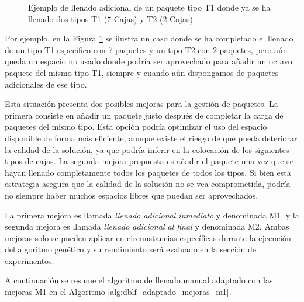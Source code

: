 \begin{figure}[H]
    \centering
    
    \caption{Ejemplo de llenado adicional de un paquete tipo T1 donde ya se ha llenado dos tipos T1 (7 Cajas) y T2 (2 Cajas).}
    \label{fig:llenado_adicional}
\end{figure}

Por ejemplo, en la Figura \ref{fig:llenado_adicional} se ilustra un caso donde se ha completado el llenado de un tipo T1 específico con 7 paquetes y un tipo T2 con 2 paquetes, pero aún queda un espacio no usado donde podría ser aprovechado para añadir un octavo paquete del mismo tipo T1, siempre y cuando aún dispongamos de paquetes adicionales de ese tipo.

Esta situación presenta dos posibles mejoras para la gestión de paquetes. La primera consiste en añadir un paquete justo después de completar la carga de paquetes del mismo tipo. Esta opción podría optimizar el uso del espacio disponible de forma más eficiente, aunque existe el riesgo de que pueda deteriorar la calidad de la solución, ya que podría inferir en la colocación de los siguientes tipos de cajas. La segunda mejora propuesta es añadir el paquete una vez que se hayan llenado completamente todos los paquetes de todos los tipos. Si bien esta estrategia asegura que la calidad de la solución no se vea comprometida, podría no siempre haber muchos espacios libres que puedan ser aprovechados.

La primera mejora es llamada \textit{llenado adicional inmediato} y denominada M1, y la segunda mejora es llamada \textit{llenado adicional al final} y denominada  M2. Ambas mejoras solo se pueden aplicar en circunstancias específicas durante la ejecución del algoritmo genético y su rendimiento será evaluado en la sección de experimentos.

A continuación se resume el algoritmo de llenado manual adaptado con las mejoras M1 en el Algoritmo \ref{alg:dblf_adaptado_mejoras_m1}.

